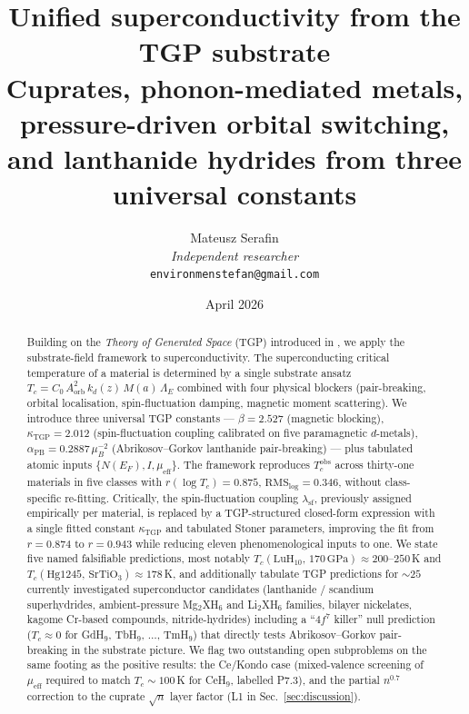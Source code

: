 \documentclass[11pt,a4paper]{article}
\title{%
  \textbf{Unified superconductivity from the TGP substrate}\\[4pt]
  \large Cuprates, phonon-mediated metals, pressure-driven orbital switching,\\
  \large and lanthanide hydrides from three universal constants%
}
\author{Mateusz Serafin\\[2pt]
\small\textit{Independent researcher}\\[-2pt]
\small\texttt{environmenstefan@gmail.com}}
\date{April 2026}
\newcommand{\lamsf}{\lambda_{\mathrm{sf}}}
\newcommand{\GPa}{\,\mathrm{GPa}}
\newcommand{\LamE}{\Lambda_{E}}
\newcommand{\Tcobs}{T_{c}^{\mathrm{obs}}}
\begin{document}
\maketitle

\begin{abstract}
Building on the \emph{Theory of Generated Space} (TGP) introduced in
\cite{TGP-core}, we apply the substrate-field framework to
superconductivity. The superconducting critical temperature of a material
is determined by a single substrate ansatz
$T_{c}=C_{0}\,A_{\mathrm{orb}}^{2}\,k_{d}(z)\,M(a)\,\LamE$
combined with four physical blockers (pair-breaking, orbital localisation,
spin-fluctuation damping, magnetic moment scattering). We introduce three
universal TGP constants --- $\beta=2.527$ (magnetic blocking),
$\kappa_{\mathrm{TGP}}=2.012$ (spin-fluctuation coupling calibrated on
five paramagnetic $d$-metals),
$\alpha_{\mathrm{PB}}=0.2887\,\mu_{B}^{-2}$ (Abrikosov--Gorkov lanthanide
pair-breaking) --- plus tabulated atomic inputs
$\{N(E_{F}),I,\mu_{\mathrm{eff}}\}$. The framework reproduces
$\Tcobs$ across thirty-one materials in five classes with
$r(\log T_{c})=0.875$, $\mathrm{RMS}_{\log}=0.346$, without class-specific
re-fitting. Critically, the spin-fluctuation coupling $\lamsf$, previously
assigned empirically per material, is replaced by a TGP-structured
closed-form expression with a single fitted constant
$\kappa_{\mathrm{TGP}}$ and tabulated Stoner parameters, improving the
fit from $r=0.874$ to $r=0.943$ while reducing eleven phenomenological
inputs to one. We state five named falsifiable predictions, most notably
$T_{c}(\mathrm{LuH}_{10},\,170\GPa)\approx 200\text{--}250$\,K and
$T_{c}(\mathrm{Hg}1245,\,\text{SrTiO}_{3})\approx 178$\,K, and
additionally tabulate TGP predictions for $\sim\!25$ currently investigated
superconductor candidates (lanthanide / scandium superhydrides,
ambient-pressure Mg$_{2}$XH$_{6}$ and Li$_{2}$XH$_{6}$ families, bilayer
nickelates, kagome Cr-based compounds, nitride-hydrides) including a
``$4f^{7}$ killer'' null prediction ($T_{c}\approx 0$ for GdH$_{9}$,
TbH$_{9}$, $\ldots$, TmH$_{9}$) that directly tests Abrikosov--Gorkov
pair-breaking in the substrate picture. We flag two outstanding open
subproblems on the same footing as the positive results: the Ce/Kondo
case (mixed-valence screening of $\mu_{\mathrm{eff}}$ required to match
$T_{c}\!\sim\!100$\,K for CeH$_{9}$, labelled P7.3), and the partial
$n^{0.7}$ correction to the cuprate $\sqrt{n}$ layer factor (L1 in
Sec.~\ref{sec:discussion}).
\end{abstract}
\end{document}
